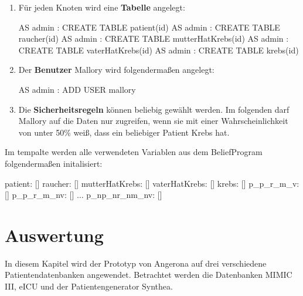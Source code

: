 \documentclass[german,version-2020-11]{uzl-thesis}
\begin{document}
\begin{enumerate}
	\item  Für jeden Knoten wird eine \textbf{Tabelle} angelegt: 
\begin{Pseudocode}
AS admin : CREATE TABLE patient(id)
AS admin : CREATE TABLE raucher(id)
AS admin : CREATE TABLE mutterHatKrebs(id)
AS admin : CREATE TABLE vaterHatKrebs(id)
AS admin : CREATE TABLE krebs(id)
\end{Pseudocode}
\item Der \textbf{Benutzer} Mallory wird folgendermaßen angelegt:
\begin{Pseudocode}
AS admin : ADD USER mallory
\end{Pseudocode}
\item Die \textbf{Sicherheitsregeln} können beliebig gewählt werden. Im folgenden darf Mallory auf die Daten nur zugreifen, wenn sie mit einer Wahrscheinlichkeit von unter 50\% weiß, dass ein beliebiger Patient Krebs hat.
\end{enumerate}

Im tempalte werden alle verwendeten Variablen aus dem BeliefProgram folgendermaßen initalisiert: 
\begin{Pseudocode}
patient: []
raucher: []
mutterHatKrebs: []
vaterHatKrebs: []
krebs: []
p_p_r_m_v: []
p_p_r_m_nv: []
$\dots$
p_np_nr_nm_nv: []
\end{Pseudocode}

\chapter{Auswertung}
In diesem Kapitel wird der Prototyp von Angerona auf drei verschiedene Patientendatenbanken angewendet. Betrachtet werden die Datenbanken MIMIC III, eICU und der Patientengenerator Synthea.
\end{document}
